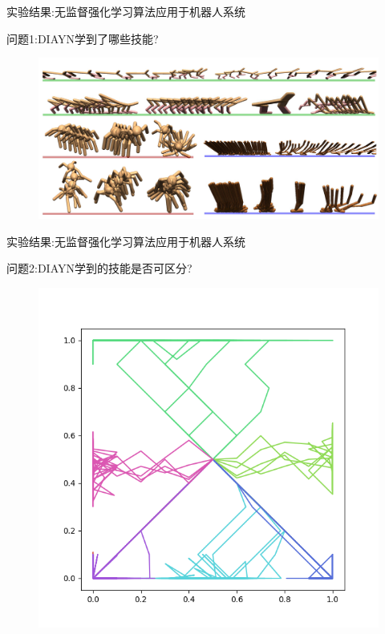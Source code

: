 \documentclass{beamer}
\begin{document}
\begin{frame}{实验结果:无监督强化学习算法应用于机器人系统}
\begin{block}{问题1:DIAYN学到了哪些技能?}
\begin{figure}[p]
\begin{center}
    \includegraphics[width=0.9\linewidth]{pic/skills.jpg}
\end{center}
\end{figure}
\end{block}
\end{frame}

\begin{frame}{实验结果:无监督强化学习算法应用于机器人系统}
\begin{block}{问题2:DIAYN学到的技能是否可区分?}
\begin{figure}[htpb]
\begin{center}
    \includegraphics[width=0.6\linewidth]{pic/square.png}
\end{center}
\end{figure}
\end{block}
\end{frame}
\end{document}
